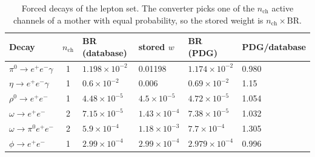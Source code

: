 \documentclass[11pt,a4paper]{article}
\newcommand{\piz}{\ensuremath{\pi^{0}}\xspace}
\newcommand{\ee}{\ensuremath{e^{+}e^{-}}\xspace}
\begin{document}
\begin{table}[H]
\centering
\caption{Forced decays of the lepton set. The converter picks one of the $n_{\mathrm{ch}}$
active channels of a mother with equal probability, so the stored weight is
$n_{\mathrm{ch}}\times\mathrm{BR}$.}
\label{tab:forced}
\begin{tabular}{@{}l c l l l l@{}}
\toprule
Decay & $n_{\mathrm{ch}}$ & BR (database) & stored $w$ & BR (PDG) & PDG/database \\
\midrule
$\piz\to\ee\gamma$          & 1 & $1.198\times10^{-2}$ & 0.01198 & $1.174\times10^{-2}$ & 0.980 \\
$\eta\to\ee\gamma$          & 1 & $0.6\times10^{-2}$ & 0.006 & $0.69\times10^{-2}$ & 1.15 \\
$\rho^0\to\ee$              & 1 & $4.48\times10^{-5}$ & $4.5\times10^{-5}$ & $4.72\times10^{-5}$ & 1.054 \\
$\omega\to\ee$              & 2 & $7.15\times10^{-5}$ & $1.43\times10^{-4}$ & $7.38\times10^{-5}$ & 1.032 \\
$\omega\to\piz\ee$          & 2 & $5.9\times10^{-4}$ & $1.18\times10^{-3}$ & $7.7\times10^{-4}$ & 1.305 \\
$\phi\to\ee$                & 1 & $2.99\times10^{-4}$ & $2.99\times10^{-4}$ & $2.979\times10^{-4}$ & 0.996 \\
\bottomrule
\end{tabular}
\end{table}
\end{document}
